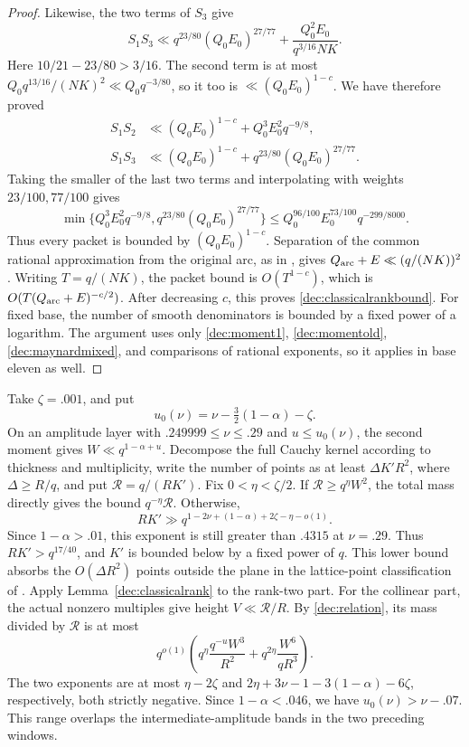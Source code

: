 \documentclass[11pt,a4paper]{article}
\theoremstyle{paperplain}
\numberwithin{equation}{section}
\begin{document}
\begin{proof}
Likewise, the two terms of $S_3$ give
\[
 S_1S_3\ll q^{23/80}(Q_0E_0)^{27/77}
             +\frac{Q_0^2E_0}{q^{3/16}NK}.
\]
Here $10/21-23/80>3/16$.
The second term is at most
$Q_0q^{13/16}/(NK)^2\ll Q_0q^{-3/80}$, so it too is
$\ll(Q_0E_0)^{1-c}$. We have therefore proved
\begin{align*}
 S_1S_2&\ll(Q_0E_0)^{1-c}+Q_0^3E_0^2q^{-9/8},\\
 S_1S_3&\ll(Q_0E_0)^{1-c}+q^{23/80}(Q_0E_0)^{27/77}.
\end{align*}
Taking the smaller of the last two terms and interpolating with weights
$23/100,77/100$ gives
\[
 \min\{Q_0^3E_0^2q^{-9/8}, q^{23/80}(Q_0E_0)^{27/77}\}
 \le Q_0^{96/100}E_0^{73/100}q^{-299/8000}.
\]
Thus every packet is bounded by $(Q_0E_0)^{1-c}$.
Separation of the common rational approximation from the original arc,
as in \cite[Lemma 14.2]{Maynard2019}, gives
$Q_{\rm arc}+E\ll(q/(NK))^2$.
Writing $T=q/(NK)$, the packet bound is $O(T^{1-c})$,
which is $O(T(Q_{\rm arc}+E)^{-c/2})$.
After decreasing $c$, this proves \eqref{dec:classicalrankbound}.
For fixed base, the number of smooth denominators is bounded by a
fixed power of a logarithm. The argument uses only
\eqref{dec:moment1}, \eqref{dec:momentold}, \eqref{dec:maynardmixed},
and comparisons of rational exponents, so it applies in base eleven
as well.
\end{proof}

Take $\zeta=.001$, and put
\[
 u_0(\nu)=\nu-\tfrac32(1-\alpha)-\zeta.
\]
On an amplitude layer with $.249999\le\nu\le.29$ and
$u\le u_0(\nu)$, the second moment gives $W\ll q^{1-\alpha+u}$.
Decompose the full Cauchy kernel according to thickness and multiplicity,
write the number of points as at least $\Delta K'R^2$, where
$\Delta\ge R/q$, and put $\mathcal R=q/(RK')$.
Fix $0<\eta<\zeta/2$. If $\mathcal R\ge q^\eta W^2$, the total
mass directly gives the bound $q^{-\eta}\mathcal R$.
Otherwise,
\begin{equation}\label{dec:largeamplitudeNK}
 RK'\gg q^{1-2\nu+(1-\alpha)+2\zeta-\eta-o(1)}.
\end{equation}
Since $1-\alpha>.01$, this exponent is still greater than $.4315$
at $\nu=.29$. Thus $RK'>q^{17/40}$, and $K'$ is bounded below
by a fixed power of $q$. This lower bound absorbs the
$O(\Delta R^2)$ points outside the plane in the lattice-point
classification of \cite[Lemma 13.2]{Maynard2019}.
Apply Lemma~\ref{dec:classicalrank} to the rank-two part.
For the collinear part, the actual nonzero multiples give height
$V\ll\mathcal R/R$. By \eqref{dec:relation}, its mass divided by
$\mathcal R$ is at most
\[
 q^{o(1)}\left(q^\eta\frac{q^{-u}W^3}{R^2}
          +q^{2\eta}\frac{W^6}{qR^3}\right).
\]
The two exponents are at most $\eta-2\zeta$ and
$2\eta+3\nu-1-3(1-\alpha)-6\zeta$, respectively, both strictly negative.
Since $1-\alpha<.046$, we have $u_0(\nu)>\nu-.07$.
This range overlaps the intermediate-amplitude bands in the two
preceding windows.
\end{document}
